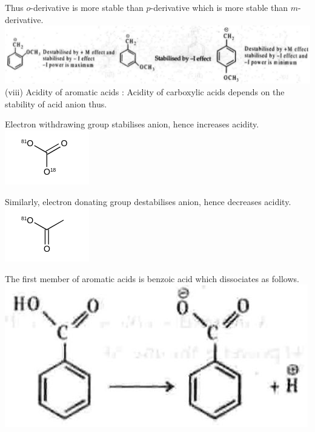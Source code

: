 \documentclass[10pt]{article}
\begin{document}
Thus $o$-derivative is more stable than $p$-derivative which is more stable than $m$-derivative.\\
\includegraphics[max width=\textwidth, center]{2025_01_28_8470952b98110cec3aabg-076}\\
(viii) Acidity of aromatic acids : Acidity of carboxylic acids depends on the stability of acid anion thus.

Electron withdrawing group stabilises anion, hence increases acidity.\\
\includegraphics{smile-c327fc8212932eab7e615e0323778d022a9838ec}

Similarly, electron donating group destabilises anion, hence decreases acidity.\\
\includegraphics{smile-343ea297f8d4100e258d31b6a438998718129584}

The first member of aromatic acids is benzoic acid which dissociates as follows.\\
\includegraphics[max width=\textwidth, center]{2025_01_28_8470952b98110cec3aabg-077(1)}
\end{document}
